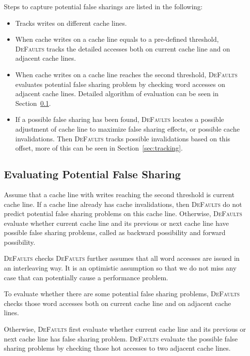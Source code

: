 \documentclass[10pt]{sigplanconf}
\newcommand{\defaults}{{\scshape DeFaults}}
\begin{document}
Steps to capture potential false sharings are listed in the following:
\begin{itemize}
\item
Tracks writes on different cache lines. 

\item
When cache writes on a cache line equals to a pre-defined threshold, \defaults{} tracks the detailed accesses 
both on current cache line and on adjacent cache lines. 

\item
When cache writes on a cache line reaches the second threshold, \defaults{} evaluates potential false sharing problem by
checking word accesses on adjacent cache lines. 
Detailed algorithm of evaluation can be seen in Section~\ref{sec:evaluation}.

\item 
If a possible false sharing has been found, 
\defaults{} locates a possible adjustment of cache line to maximize false sharing effects, or possible cache invalidations. 
Then \defaults{} tracks possible invalidations based on this offset, more of this can be seen in Section~\ref{sec:tracking}.
\end{itemize}

\subsection{Evaluating Potential False Sharing}
\label{sec:evaluation}
Assume that a cache line with writes reaching the second threshold is current cache line. 
If a cache line already has cache invalidations, then \defaults{} do not predict potential false sharing problems on this cache line. 
Otherwise, \defaults{} evaluate whether current cache line and its previous or next cache line have possible false sharing problems,  
called as backward possibility and forward possibility.

\defaults{} checks 
\defaults{} further assumes that all word accesses are issued in an interleaving way. It is an 
optimistic assumption so that we do not miss any case that can potentially cause a performance
problem.

To evaluate whether there are some potential false sharing problems, 
\defaults{} checks those word accesses both on current cache line and on adjacent cache lines. 

Otherwise, \defaults{} first evaluate whether current cache line and its previous or next cache line has false sharing problem. 
\defaults{} evaluate the possible false sharing problems by checking those hot accesses to two adjacent cache lines.
\end{document}
